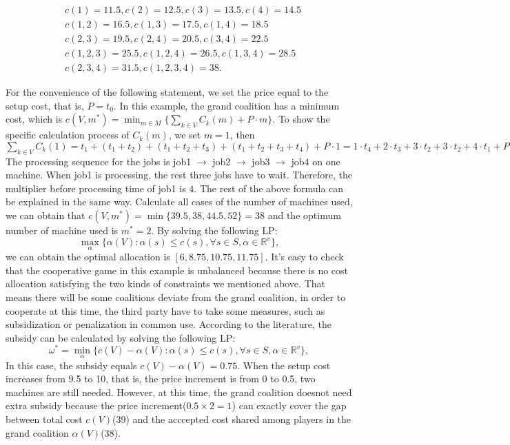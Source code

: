 \[
\begin{aligned}
& c({1}) = 11.5, c({2}) = 12.5, c({3}) = 13.5, c({4}) = 14.5  \\
& c({1,2}) = 16.5, c({1,3}) = 17.5, c({1,4}) = 18.5 \\
& c({2,3}) = 19.5, c({2,4}) = 20.5, c({3,4}) = 22.5 \\
& c({1,2,3}) = 25.5, c({1,2,4}) = 26.5, c({1,3,4}) = 28.5 \\
& c({2,3,4}) = 31.5, c({1,2,3,4}) = 38.
\end{aligned}
\]

For the convenience of the following statement, we set the price equal to the setup cost, that is, $P = t_0$.
In this example, the grand coalition has a minimum cost, which is $c(V,m^*) = \min_{m \in M} \{\sum_{k\in V}{C_k(m)}+ P\cdot m\}.$ To show the specific calculation process of $C_k(m)$, we set $m=1$, then $\sum_{k\in V}{C_k(1)} = t_1 + (t_1 + t_2) + (t_1 + t_2 + t_3) + (t_1 + t_2 + t_3 + t_4) + P\cdot 1 =
1 \cdot t_4 + 2\cdot t_3 + 3 \cdot t_2 + 3 \cdot t_2 + 4 \cdot t_1 + P \cdot 1.$
The processing sequence for the jobs is job1 $\to$ job2 $\to$ job3 $\to$ job4 on one machine. When job1 is processing, the rest three jobs have to wait. Therefore, the multiplier before processing time of job1 is $4$. The rest of the above formula can be explained in the same way.
Calculate all cases of the number of machines used, we can obtain that
$c(V,m^*) = \min\{39.5, 38, 44.5, 52\} = 38$ and the optimum number of machine used is $m^* = 2$.
By solving the following LP:
\[
  \mathop{\max}_{\alpha}\{\alpha(V): \alpha(s)\leq c(s),\forall s \in S, \alpha\in\mathbb{R}^{v}\},
\]
we can obtain the optimal allocation is $[6, 8.75, 10.75, 11.75]$.
It's easy to check that the cooperative game in this example is unbalanced because there is no cost allocation satisfying the two kinds of constraints we mentioned above. That means there will be some coalitions deviate from the grand coalition, in order to cooperate at this time, the third party have to take some measures, such as subsidization or penalization in common use.
According to the literature, the subsidy can be calculated by solving the following LP:
\[
  {\omega^*}=\mathop{\min}_{\alpha}\{c(V)-\alpha(V): \alpha(s)\leq c(s)
 ,\forall s \in S, \alpha\in\mathbb{R}^{v}\},
\]
In this case, the subsidy equals $c(V) - \alpha(V) = 0.75$.
When the setup cost increases from 9.5 to 10, that is, the price increment is from 0 to 0.5, two machines are still needed. However, at this time, the grand coalition doesnot need extra subsidy because the price increment($0.5\times 2 =1$) can exactly cover the gap between total cost $c(V)$(39) and the acccepted cost shared among players in the grand coalition $\alpha(V)$(38).

